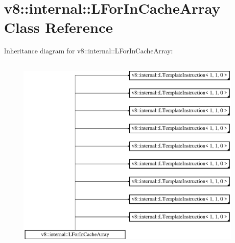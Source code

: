 \hypertarget{classv8_1_1internal_1_1_l_for_in_cache_array}{}\section{v8\+:\+:internal\+:\+:L\+For\+In\+Cache\+Array Class Reference}
\label{classv8_1_1internal_1_1_l_for_in_cache_array}
Inheritance diagram for v8\+:\+:internal\+:\+:L\+For\+In\+Cache\+Array\+:\begin{figure}[H]
\begin{center}
\leavevmode
\includegraphics[height=10.000000cm]{classv8_1_1internal_1_1_l_for_in_cache_array}
\end{center}
\end{figure}

